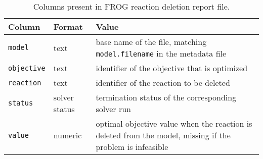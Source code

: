 \begin{table}\tablefont
\begin{tabular}{llp{30em}}
\toprule
Column & Format & Value \\
\midrule
\verb|model|
 & text
 & base name of the file, matching \verb|model.filename| in the metadata file
 \\
\verb|objective|
 & text
 & identifier of the objective that is optimized
 \\
\verb|reaction|
 & text
 & identifier of the reaction to be deleted
 \\
\verb|status|
 & solver status
 & termination status of the corresponding solver run
 \\
\verb|value|
 & numeric
 & optimal objective value when the reaction is deleted from the model, missing if the problem is infeasible
 \\
\bottomrule
\end{tabular}
\caption{Columns present in FROG reaction deletion report file.}
\label{tab:rxnsfields}
\end{table}
